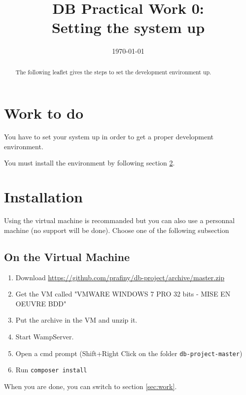 \documentclass[twoside,a4paper,12pt]{article}
\title{DB Practical Work 0:\\Setting the system up}
\date{\today}
\begin{document}
\maketitle

\begin{abstract}
  The following leaflet gives the steps to set the development environment up.
\end{abstract}

\tableofcontents

\clearpage

\section{Work to do}
You have to set your system up in order to get a proper development environment.

You must install the environment by following section \ref{sec:installation}.

\section{Installation}
\label{sec:installation}

Using the virtual machine is recommanded but you can also use a personnal machine (no support will be done). Choose one of the following subsection 

\subsection{On the Virtual Machine}
\begin{enumerate}
\item Download \url{https://github.com/prafiny/db-project/archive/master.zip}
\item Get the VM called "VMWARE WINDOWS 7 PRO 32 bits - MISE EN OEUVRE BDD"
\item Put the archive in the VM and unzip it.
\item Start WampServer.
\item Open a cmd prompt (Shift+Right Click on the folder \texttt{db-project-master})
\item Run \texttt{composer install}
\end{enumerate}

When you are done, you can switch to section \ref{sec:work}.
\end{document}
